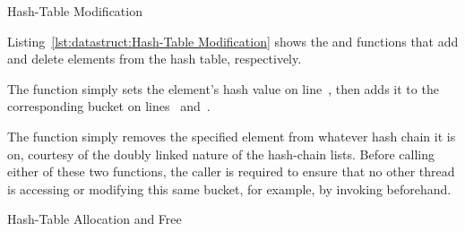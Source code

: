 \QuickQuizEnd

\begin{listing}

\caption{Hash-Table Modification}
\label{lst:datastruct:Hash-Table Modification}
\end{listing}

Listing~\ref{lst:datastruct:Hash-Table Modification}
shows the  and  functions
that add and delete elements from the hash table, respectively.

\begin{fcvref}
The  function simply sets the element's hash
value on line~, then adds it to the corresponding bucket on
lines~ and~.
\end{fcvref}
The  function simply removes the specified element
from whatever hash chain it is on, courtesy of the doubly linked
nature of the hash-chain lists.
Before calling either of these two functions, the caller is required to
ensure that no other thread is accessing
or modifying this same bucket, for example, by invoking
 beforehand.

\begin{listing}

\caption{Hash-Table Allocation and Free}
\label{lst:datastruct:Hash-Table Allocation and Free}
\end{listing}

